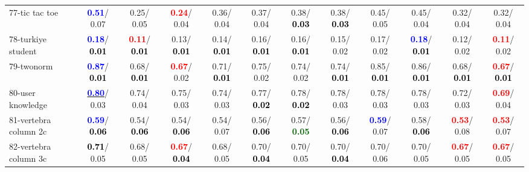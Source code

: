\begin{table}[h]
\begin{center}
{\begin{tabular}{lc|c|c|c|c|c|c|c|c|c|c}
77-tic tac toe & \textcolor{blue}{\textbf{  0.51}}/  0.07 &   0.25/  0.05 & \textcolor{red}{\textbf{  0.24}}/  0.04 &   0.36/  0.04 &   0.37/  0.04 &   0.38/\textcolor{black}{\textbf{  0.03}} &   0.38/\textcolor{black}{\textbf{  0.03}} &   0.45/  0.05 &   0.45/  0.04 &   0.32/  0.04 &   0.32/  0.04 \\
78-turkiye student & \textcolor{blue}{\textbf{  0.18}}/\textcolor{black}{\textbf{  0.01}} & \textcolor{red}{\textbf{  0.11}}/\textcolor{black}{\textbf{  0.01}} &   0.13/\textcolor{black}{\textbf{  0.01}} &   0.14/\textcolor{black}{\textbf{  0.01}} &   0.16/\textcolor{black}{\textbf{  0.01}} &   0.16/\textcolor{black}{\textbf{  0.01}} &   0.15/  0.02 &   0.17/  0.02 & \textcolor{blue}{\textbf{  0.18}}/\textcolor{black}{\textbf{  0.01}} &   0.12/  0.02 & \textcolor{red}{\textbf{  0.11}}/  0.02 \\ \hline
79-twonorm & \textcolor{blue}{\textbf{  0.87}}/\textcolor{black}{\textbf{  0.01}} &   0.68/\textcolor{black}{\textbf{  0.01}} & \textcolor{red}{\textbf{  0.67}}/  0.02 &   0.71/\textcolor{black}{\textbf{  0.01}} &   0.75/  0.02 &   0.74/  0.02 &   0.74/\textcolor{black}{\textbf{  0.01}} &   0.85/\textcolor{black}{\textbf{  0.01}} &   0.86/\textcolor{black}{\textbf{  0.01}} &   0.68/\textcolor{black}{\textbf{  0.01}} & \textcolor{red}{\textbf{  0.67}}/\textcolor{black}{\textbf{  0.01}} \\
80-user knowledge & \underline{\textcolor{blue}{\textbf{  0.80}}}/  0.03 &   0.74/  0.04 &   0.75/  0.03 &   0.74/  0.03 &   0.77/\textcolor{black}{\textbf{  0.02}} &   0.78/\textcolor{black}{\textbf{  0.02}} &   0.78/  0.03 &   0.78/  0.03 &   0.78/  0.03 &   0.72/  0.03 & \textcolor{red}{\textbf{  0.69}}/  0.04 \\
81-vertebra column 2c & \textcolor{blue}{\textbf{  0.59}}/\textcolor{black}{\textbf{  0.06}} &   0.54/\textcolor{black}{\textbf{  0.06}} &   0.54/\textcolor{black}{\textbf{  0.06}} &   0.54/  0.07 &   0.56/\textcolor{black}{\textbf{  0.06}} &   0.57/\textcolor{darkgreen}{\textbf{  0.05}} &   0.56/\textcolor{black}{\textbf{  0.06}} & \textcolor{blue}{\textbf{  0.59}}/  0.07 &   0.58/\textcolor{black}{\textbf{  0.06}} & \textcolor{red}{\textbf{  0.53}}/  0.08 & \textcolor{red}{\textbf{  0.53}}/  0.07 \\
82-vertebra column 3c & \textcolor{black}{\textbf{  0.71}}/  0.05 &   0.68/  0.05 & \textcolor{red}{\textbf{  0.67}}/\textcolor{black}{\textbf{  0.04}} &   0.68/  0.05 &   0.70/\textcolor{black}{\textbf{  0.04}} &   0.70/  0.05 &   0.70/\textcolor{black}{\textbf{  0.04}} &   0.70/  0.06 &   0.70/  0.05 & \textcolor{red}{\textbf{  0.67}}/  0.05 & \textcolor{red}{\textbf{  0.67}}/  0.05 \\

\end{tabular}}
\end{center}
\end{table}
